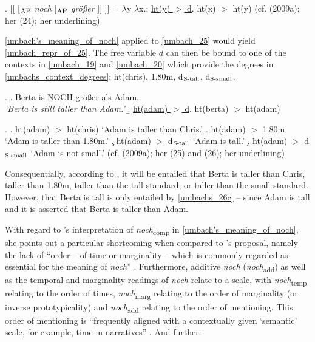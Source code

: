 \documentclass[output=paper,
modfonts
]{langscibook}
\begin{document}
\ex. [[ [$_{\textnormal{\footnotesize{AP}}}$ \textit{noch} [$_{\textnormal{\footnotesize{AP}}}$ \textit{größer} ]] ]] = $\lambda$y $\lambda$x.: \underline{ht(y) $>$ d}. ht(x) $>$ ht(y) \label{umbach's_meaning_of_noch} \flushright (cf. \citeauthor{umbach2009a_comp} (2009a); her (24); her underlining)

\ref{umbach's_meaning_of_noch} applied to \ref{umbach_25} would yield \ref{umbach_repr_of_25}. The free variable $d$ can then be bound to one of the contexts in \ref{umbach_19} and \ref{umbach_20} which provide the degrees in \ref{umbachs_context_degrees}: ht(chris), 1.80m, d$_{\textnormal{\scriptsize{S-tall}}}$, d$_{\textnormal{\scriptsize{S-small}}}$.

\ex. \a. \label{umbach_25} Berta is NOCH größer als Adam. \\ \textit{`Berta is still taller than Adam.'} \vspace{12pt}
\b. \label{umbach_repr_of_25} \underline{ht(adam) $>$ d}. ht(berta) $>$ ht(adam)  \vspace{12pt}


\ex. \label{umbachs_context_degrees} \a. ht(adam) $>$ ht(chris) \hspace{22.5pt} `Adam is taller than Chris.'\label{umbach_26a}
\b. ht(adam) $>$ 1.80m          \hspace{33.5pt} `Adam is taller than 1.80m.'
\c. ht(adam) $>$ d$_{\textnormal{\scriptsize{S-tall}}}$   \hspace{35pt} `Adam is tall.' \label{umbach_26c}
\d. ht(adam) $>$ d$_{\textnormal{\scriptsize{S-small}}}$  \hspace{28.5pt} `Adam is not small.' \flushright (cf. \citeauthor{umbach2009a_comp} (2009a); her (25) and (26); her underlining)


\noindent Consequentially, according to \citeauthor{umbach2009a_comp}, it will be entailed that Berta is taller than Chris, taller than 1.80m, taller than the tall-standard, or taller than the small-standard. However, that Berta is tall is only entailed by \ref{umbachs_26c} -- since Adam is tall and it is asserted that Berta is taller than Adam.

With regard to \citeauthor{umbach2009a_comp}'s interpretation of \textit{noch}\textsubscript{comp} in \ref{umbach's_meaning_of_noch}, she points out a particular shortcoming when compared to \citeauthor{koenig1977}'s \citeyearpar{koenig1977} proposal, namely the lack of ``order -- of time or marginality -- which is commonly regarded as essential for the meaning of \textit{noch}'' \citep[p.12]{umbach2009a_comp}. Furthermore, additive \textit{noch} (\textit{noch}\textsubscript{add}) as well as the temporal and marginality readings of \textit{noch} relate to a scale, with \textit{noch}\textsubscript{temp} relating to the order of times, \textit{noch}\textsubscript{marg} relating to the order of marginality (or inverse prototypicality) and \textit{noch}\textsubscript{add} relating to the order of mentioning. This order of mentioning is ``frequently aligned with a contextually given `semantic' scale, for example, time in narratives'' \citep[p.12]{umbach2009a_comp}. And further:
\end{document}
